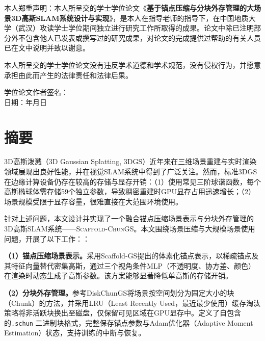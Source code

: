 \documentclass[zihao=-4,twoside,openright,fontset=none]{ctexbook}
\numberwithin{figure}{chapter}
\numberwithin{table}{chapter}
\numberwithin{equation}{chapter}
\newcommand{\ScaffoldChunGS}{\textsc{Scaffold-ChunGS}\xspace}
\newcommand{\schun}{\texttt{.schun}\xspace}
\begin{document}
{\songti{}
本人郑重声明：本人所呈交的学士学位论文《\textbf{基于锚点压缩与分块外存管理的大场景3D高斯SLAM系统设计与实现}》，是本人在指导老师的指导下，在中国地质大学（武汉）攻读学士学位期间独立进行研究工作所取得的成果。论文中除已注明部分外不包含他人已发表或撰写过的研究成果，对论文的完成提供过帮助的有关人员已在文中说明并致以谢意。

\vspace{1cm}

本人所呈交的学士学位论文没有违反学术道德和学术规范，没有侵权行为，并愿意承担由此而产生的法律责任和法律后果。

\vspace{2cm}

\begin{flushright}
学位论文作者签名：\underline{\hspace{3cm}} \\[2cm]
日\qquad 期：\qquad 年\qquad 月\qquad 日
\end{flushright}
}

\chapter*{\heiti{}\bfseries 摘\quad 要}

3D高斯泼溅（3D Gaussian Splatting, 3DGS）近年来在三维场景重建与实时渲染领域展现出良好性能，并在视觉SLAM系统中得到了广泛关注。然而，标准3DGS在边缘计算设备仍存在较高的存储与显存开销：（1）使用常见三阶球谐函数，每个高斯椭球体需存储59个独立参数，导致稠密重建时GPU显存占用迅速增长\cite{kerbl20233dgaussians}；（2）场景规模受限于显存容量，很难直接在大范围环境使用。

针对上述问题，本文设计并实现了一个融合锚点压缩场景表示与分块外存管理的3D高斯SLAM系统——\ScaffoldChunGS。本文围绕场景压缩与大规模场景使用问题，开展了以下工作：：

\textbf{（1）锚点压缩场景表示。}采用Scaffold-GS\cite{lu2024scaffoldgs}提出的体素化锚点表示，以稀疏锚点及其特征向量替代密集高斯，通过三个视角条件MLP（不透明度、协方差、颜色）在渲染时动态生成子高斯参数。该方案能够显著降低单高斯的存储开销。

\textbf{（2）分块外存管理。}参考DiskChunGS\cite{feldmann2026diskchungs}将场景按空间划分为固定大小的块（Chunk）的方法，并采用LRU（Least Recently Used，最近最少使用）缓存淘汰策略将非活跃块换出至磁盘，仅保留可见区域在GPU显存中。定义了自包含的\schun 二进制块格式，完整保存锚点参数与Adam优化器（Adaptive Moment Estimation）\cite{kingma2014adam}状态，支持训练的中断与恢复。
\end{document}
